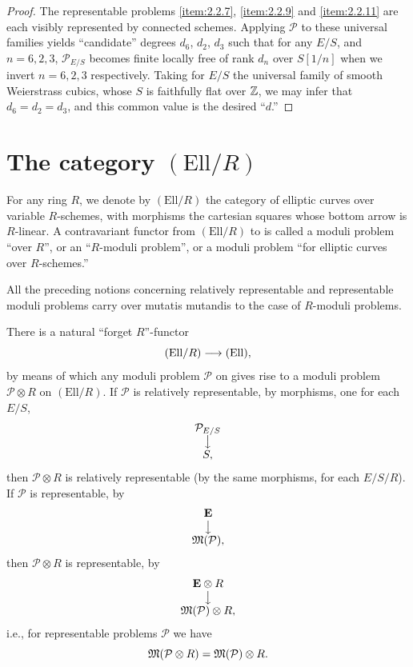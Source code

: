 \begin{proof}
The representable problems \ref{item:2.2.7}, \ref{item:2.2.9} and \ref{item:2.2.11} are each visibly represented by connected schemes. Applying $\mathcal{P}$ to these universal families yields ``candidate'' degrees $d_6$, $d_2$, $d_3$ such that for any $E/S$, and $n = 6, 2, 3$, $\mathcal{P}_{E/S}$ becomes finite locally free of rank $d_n$ over $S[1/n]$ when we invert $n = 6, 2, 3$ respectively. Taking for $E/S$ the universal family of smooth Weierstrass cubics, whose $S$ is faithfully flat over $\mathbb{Z}$, we may infer that $d_6 = d_2 = d_3$, and this common value is the desired ``$d$.''
\end{proof}

\section{The category $(\mathrm{Ell}/R)$}
\label{sec:4.13}

For any ring $R$, we denote by $(\mathrm{Ell}/R)$ the category of elliptic curves over variable $R$-schemes, with morphisms the cartesian squares whose bottom arrow is $R$-linear. A contravariant functor from $(\mathrm{Ell}/R)$ to \Sets is called a moduli problem ``over $R$'', or an ``$R$-moduli problem'', or a moduli problem ``for elliptic curves over $R$-schemes.''

All the preceding notions concerning relatively representable and representable moduli problems carry over mutatis mutandis to the case of $R$-moduli problems.

There is a natural ``forget $R$''-functor
\[
(\mathrm{Ell}/R) \longrightarrow (\mathrm{Ell}),
\]
by means of which any moduli problem $\mathcal{P}$ on \Ell gives rise to a moduli problem $\mathcal{P} \otimes R$ on $(\mathrm{Ell}/R)$. If $\mathcal{P}$ is relatively representable, by morphisms, one for each $E/S$,
\[
\begin{array}{@{}c@{}}
\mathcal{P}_{E/S} \\ \big\downarrow \\ S,
\end{array}
\]
then $\mathcal{P} \otimes R$ is relatively representable (by the same morphisms, for each $E/S/R$). If $\mathcal{P}$ is representable, by
\[
\begin{array}{@{}c@{}}
\mathbf{E} \\ \big\downarrow \\ \Mfrak(\mathcal{P}),
\end{array}
\]
then $\mathcal{P} \otimes R$ is representable, by
\[
\begin{array}{@{}c@{}}
\mathbf{E} \otimes R \\ \big\downarrow \\ \Mfrak(\mathcal{P}) \otimes R,
\end{array}
\]
i.e., for representable problems $\mathcal{P}$ we have
\[
\mathfrak{M}(\mathcal{P} \otimes R) = \mathfrak{M}(\mathcal{P}) \otimes R.
\]


